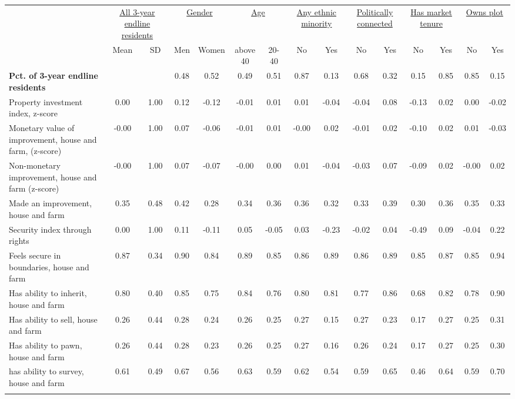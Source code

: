 \begin{tabular}{lcccccccccccccc}
\hline \noalign{\smallskip} & \multicolumn{2}{c}{\uline{\hfill All 3-year endline residents}} & \multicolumn{2}{c}{\uline{\hfill Gender \hfill}} & \multicolumn{2}{c}{\uline{\hfill Age \hfill}} & \multicolumn{2}{c}{\uline{\hfill Any ethnic minority \hfill}} & \multicolumn{2}{c}{\uline{\hfill Politically connected \hfill}} & \multicolumn{2}{c}{\uline{\hfill Has market tenure \hfill}} & \multicolumn{2}{c}{\uline{\hfill Owns plot \hfill}}\\
 & Mean & SD & Men & Women & above 40 & 20-40 & No & Yes & No & Yes & No & Yes & No & Yes\\
\noalign{\smallskip}\hline \noalign{\smallskip}\textbf{Pct. of 3-year endline residents} &  &  & 0.48 & 0.52 & 0.49 & 0.51 & 0.87 & 0.13 & 0.68 & 0.32 & 0.15 & 0.85 & 0.85 & 0.15\\
Property investment index, z-score & 0.00 & 1.00 & 0.12 & -0.12 & -0.01 & 0.01 & 0.01 & -0.04 & -0.04 & 0.08 & -0.13 & 0.02 & 0.00 & -0.02\\
\quad Monetary value of improvement, house and farm, (z-score) & -0.00 & 1.00 & 0.07 & -0.06 & -0.01 & 0.01 & -0.00 & 0.02 & -0.01 & 0.02 & -0.10 & 0.02 & 0.01 & -0.03\\
\quad Non-monetary improvement, house and farm (z-score) & -0.00 & 1.00 & 0.07 & -0.07 & -0.00 & 0.00 & 0.01 & -0.04 & -0.03 & 0.07 & -0.09 & 0.02 & -0.00 & 0.02\\
\quad Made an improvement, house and farm & 0.35 & 0.48 & 0.42 & 0.28 & 0.34 & 0.36 & 0.36 & 0.32 & 0.33 & 0.39 & 0.30 & 0.36 & 0.35 & 0.33\\
Security index through rights & 0.00 & 1.00 & 0.11 & -0.11 & 0.05 & -0.05 & 0.03 & -0.23 & -0.02 & 0.04 & -0.49 & 0.09 & -0.04 & 0.22\\
\quad Feels secure in boundaries, house and farm & 0.87 & 0.34 & 0.90 & 0.84 & 0.89 & 0.85 & 0.86 & 0.89 & 0.86 & 0.89 & 0.85 & 0.87 & 0.85 & 0.94\\
\quad Has ability to inherit, house and farm & 0.80 & 0.40 & 0.85 & 0.75 & 0.84 & 0.76 & 0.80 & 0.81 & 0.77 & 0.86 & 0.68 & 0.82 & 0.78 & 0.90\\
\quad Has ability to sell, house and farm & 0.26 & 0.44 & 0.28 & 0.24 & 0.26 & 0.25 & 0.27 & 0.15 & 0.27 & 0.23 & 0.17 & 0.27 & 0.25 & 0.31\\
\quad Has ability to pawn, house and farm & 0.26 & 0.44 & 0.28 & 0.23 & 0.26 & 0.25 & 0.27 & 0.16 & 0.26 & 0.24 & 0.17 & 0.27 & 0.25 & 0.30\\
\quad has ability to survey, house and farm & 0.61 & 0.49 & 0.67 & 0.56 & 0.63 & 0.59 & 0.62 & 0.54 & 0.59 & 0.65 & 0.46 & 0.64 & 0.59 & 0.70\\
\noalign{\smallskip}\hline\end{tabular}
